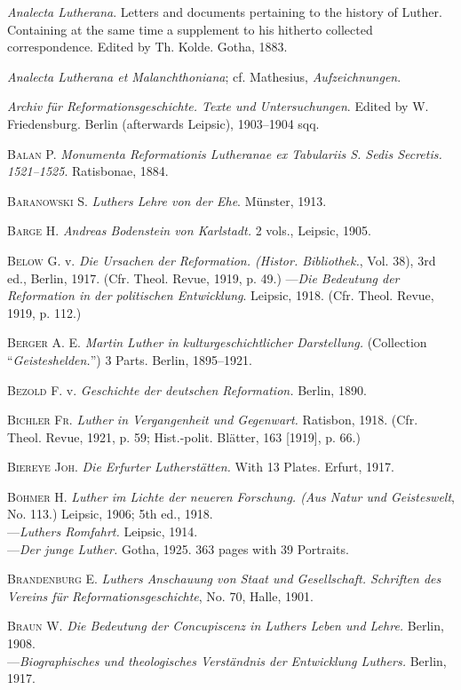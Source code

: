 \textit{Analecta Lutherana}. Letters and documents pertaining to the history of
Luther. Containing at the same time a supplement to his hitherto collected
correspondence. Edited by Th. Kolde. Gotha, 1883.

\textit{Analecta Lutherana et Malanchthoniana}; cf. Mathesius, \textit{Aufzeichnungen}.

\textit{Archiv für Reformationsgeschichte. Texte und Untersuchungen}. Edited by
W. Friedensburg. Berlin (afterwards Leipsic), 1903--1904 sqq.

\textsc{Balan P.} \textit{Monumenta Reformationis Lutheranae ex Tabulariis S. Sedis
Secretis. 1521--1525}. Ratisbonae, 1884.

\textsc{Baranowski S.} \textit{Luthers Lehre von der Ehe}. Münster, 1913.

\textsc{Barge H.} \textit{Andreas Bodenstein von Karlstadt.} 2 vols., Leipsic, 1905.

\textsc{Below G.} v. \textit{Die Ursachen der Reformation. (Histor. Bibliothek.}, Vol. 38),
3rd ed., Berlin, 1917. (Cfr. Theol. Revue, 1919, p. 49.)
---\textit{Die Bedeutung der Reformation in der politischen Entwicklung}. Leipsic,
1918. (Cfr. Theol. Revue, 1919, p. 112.)

\textsc{Berger A. E.} \textit{Martin Luther in kulturgeschichtlicher Darstellung.} (Collection
“\textit{Geisteshelden.}”) 3 Parts. Berlin, 1895--1921.

\textsc{Bezold F.} v. \textit{Geschichte der deutschen Reformation.} Berlin, 1890.

\textsc{Bichler Fr.} \textit{Luther in Vergangenheit und Gegenwart.} Ratisbon, 1918. (Cfr.
Theol. Revue, 1921, p. 59; Hist.-polit. Blätter, 163 [1919], p. 66.)

\textsc{Biereye Joh.} \textit{Die Erfurter Lutherstätten.} With 13 Plates. Erfurt, 1917.

\textsc{Böhmer H.} \textit{Luther im Lichte der neueren Forschung. (Aus Natur und
Geisteswelt}, No. 113.) Leipsic, 1906; 5th ed., 1918. \\
---\textit{Luthers Romfahrt.} Leipsic, 1914. \\
---\textit{Der junge Luther.} Gotha, 1925. 363 pages with 39 Portraits.

\textsc{Brandenburg E.} \textit{Luthers Anschauung von Staat und Gesellschaft. Schriften
des Vereins für Reformationsgeschichte}, No. 70, Halle, 1901.

\textsc{Braun W.} \textit{Die Bedeutung der Concupiscenz in Luthers Leben und Lehre.}
Berlin, 1908. \\
---\textit{Biographisches und theologisches Verständnis der Entwicklung Luthers.}
Berlin, 1917.

